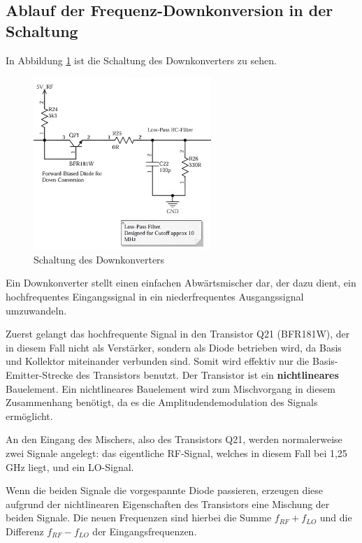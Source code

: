 \subsection{Ablauf der Frequenz-Downkonversion in der Schaltung}
In Abbildung \ref{fig:downconverter} ist die Schaltung des Downkonverters zu sehen.
\begin{figure}[H]
    \centering
    \includegraphics[width=0.6\textwidth]{Pictures/Downconverter.png}
    \caption{Schaltung des Downkonverters}
    \label{fig:downconverter}
\end{figure}
Ein Downkonverter stellt einen einfachen Abwärtsmischer dar, der dazu dient, ein hochfrequentes Eingangssignal in ein niederfrequentes Ausgangssignal umzuwandeln. 

Zuerst gelangt das hochfrequente Signal in den Transistor Q21 (BFR181W), der in diesem Fall nicht als Verstärker, sondern als Diode betrieben wird, da Basis und Kollektor miteinander verbunden sind. Somit wird effektiv nur die Basis-Emitter-Strecke des Transistors benutzt. Der Transistor ist ein \textbf{nichtlineares} Bauelement.
Ein nichtlineares Bauelement wird zum Mischvorgang in diesem Zusammenhang benötigt, da es die Amplitudendemodulation des Signals ermöglicht. 

An den Eingang des Mischers, also des Transistors Q21, werden normalerweise zwei Signale angelegt: das eigentliche \ac{RF}-Signal, welches in diesem Fall bei 1,25 GHz liegt, und ein \ac{LO}-Signal.

Wenn die beiden Signale die vorgespannte Diode passieren, erzeugen diese aufgrund der nichtlinearen Eigenschaften des Transistors eine Mischung der beiden Signale. Die neuen Frequenzen sind hierbei die Summe $f_{RF} + f_{LO}$ und die Differenz $f_{RF} - f_{LO}$ der Eingangsfrequenzen. 

